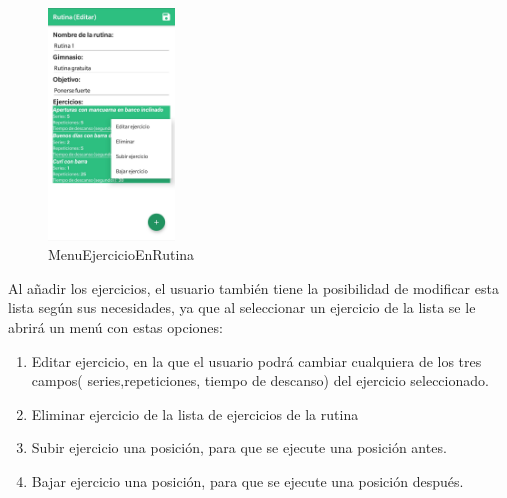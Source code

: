 \documentclass[11pt,a4paper]{report}
\begin{document}
\begin{figure}[H]
	\centering
	\includegraphics[width=0.3\textwidth]{graficos/manual/MenuEjercicioEnRutina.jpg}
	\caption{MenuEjercicioEnRutina}
\end{figure}
Al añadir los ejercicios, el usuario también tiene la posibilidad de modificar esta lista según sus necesidades, ya que al seleccionar un ejercicio de la lista se le abrirá un menú con estas opciones:
\begin{enumerate}
	\item Editar ejercicio, en la que el usuario podrá cambiar cualquiera de los tres campos( series,repeticiones, tiempo de descanso) del ejercicio seleccionado.
	\item Eliminar ejercicio de la lista de ejercicios de la rutina
	\item Subir ejercicio una posición, para que se ejecute una posición antes.

	\item Bajar ejercicio una posición, para que se ejecute una posición después.
\end{enumerate}
\end{document}
